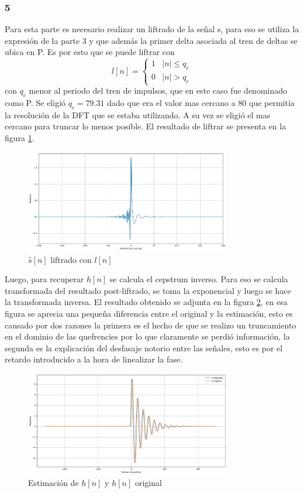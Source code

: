 \documentclass[a4paper]{article}
\begin{document}
\subsubsection{5}
Para esta parte es necesario realizar un liftrado de la señal s, para eso se utiliza la expresión de la parte 3 y que además la primer delta asociada al tren de deltas se ubica en P. Es por esto que se puede liftrar con 
$$l[n] = \begin{cases}
  1  & |n| \leq q_c  \\
  0 & |n| > q_c
\end{cases}$$
con $q_c$ menor al periodo del tren de impulsos, que en este caso fue denominado como P. Se eligió $q_c = 79.31$ dado que era el valor mas cercano a $80$ que permitía la resolución de la DFT que se estaba utilizando. A su vez se eligió el mas cercano para truncar lo menos posible. El resultado de liftrar se presenta en la figura \ref{liftrado}.
\begin{figure}[h!]
\centering
\includegraphics[width=0.8\textwidth]{liftrado.png}
\caption{$\hat{s}[n]$ liftrado con $l[n]$}
\label{liftrado}
\end{figure}
Luego, para recuperar $h[n]$ se calcula el cepstrum inverso. Para eso se calcula transformada del resultado post-liftrado, se toma la exponencial y luego se hace la transformada inversa. El resultado obtenido se adjunta en la figura \ref{hest}, en esa figura se aprecia una pequeña diferencia entre el original y la estimación, esto es causado por dos razones la primera es el hecho de que se realizo un truncamiento en el dominio de las quefrencies por lo que claramente se perdió información, la segunda es la explicación del desfasaje notorio entre las señales, esto es por el retardo introducido a la hora de linealizar la fase. 

\begin{figure}[h!]
\centering
\includegraphics[width=0.8\textwidth]{hest.png}
\caption{Estimación de $h[n]$ y $h[n]$ original}
\label{hest}
\end{figure}
\end{document}
